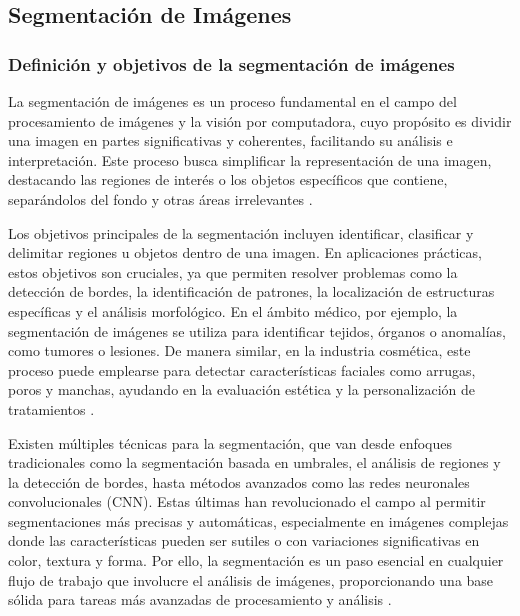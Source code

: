 \subsection{Segmentación de Imágenes}
\subsubsection{Definición y objetivos de la segmentación de imágenes}
La segmentación de imágenes es un proceso fundamental en el campo del procesamiento de imágenes y la visión por computadora, cuyo propósito es dividir una imagen en partes significativas y coherentes, facilitando su análisis e interpretación. Este proceso busca simplificar la representación de una imagen, destacando las regiones de interés o los objetos específicos que contiene, separándolos del fondo y otras áreas irrelevantes \cite{gonzalez2018}.

Los objetivos principales de la segmentación incluyen identificar, clasificar y delimitar regiones u objetos dentro de una imagen. En aplicaciones prácticas, estos objetivos son cruciales, ya que permiten resolver problemas como la detección de bordes, la identificación de patrones, la localización de estructuras específicas y el análisis morfológico. En el ámbito médico, por ejemplo, la segmentación de imágenes se utiliza para identificar tejidos, órganos o anomalías, como tumores o lesiones. De manera similar, en la industria cosmética, este proceso puede emplearse para detectar características faciales como arrugas, poros y manchas, ayudando en la evaluación estética y la personalización de tratamientos \cite{gonzalez2018}.

Existen múltiples técnicas para la segmentación, que van desde enfoques tradicionales como la segmentación basada en umbrales, el análisis de regiones y la detección de bordes, hasta métodos avanzados como las redes neuronales convolucionales (CNN). Estas últimas han revolucionado el campo al permitir segmentaciones más precisas y automáticas, especialmente en imágenes complejas donde las características pueden ser sutiles o con variaciones significativas en color, textura y forma. Por ello, la segmentación es un paso esencial en cualquier flujo de trabajo que involucre el análisis de imágenes, proporcionando una base sólida para tareas más avanzadas de procesamiento y análisis \cite{gonzalez2018}.
